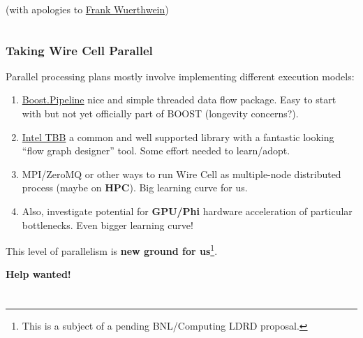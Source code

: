 \documentclass[xcolor=dvipsnames]{beamer}
\begin{document}
\begin{frame}
\begin{columns}
\begin{column}{0.30\textwidth}
\begin{center}
        \scriptsize (with apologies to \href{https://www.bnl.gov/events/details.php?q=11000}{Frank Wuerthwein})
      \end{center}
    \end{column}
  \end{columns}

\end{frame}

\begin{frame}
  \frametitle{Taking Wire Cell Parallel}

  Parallel processing plans mostly involve implementing different
  execution models:

  \begin{enumerate}\footnotesize
  \item \href{https://github.com/erenon/pipeline}{Boost.Pipeline} nice
    and simple threaded data flow package.  Easy to start with but not
    yet officially part of BOOST (longevity concerns?).
  \item \href{https://www.threadingbuildingblocks.org/}{Intel TBB} a
    common and well supported library with a fantastic looking ``flow
    graph designer'' tool.  Some effort needed to learn/adopt.
  \item MPI/ZeroMQ or other ways to run Wire Cell as multiple-node
    distributed process (maybe on \textbf{HPC}).  Big learning curve
    for us.
  \item Also, investigate potential for \textbf{GPU/Phi} hardware
    acceleration of particular bottlenecks. Even bigger learning curve!
  \end{enumerate}

  \vfill

  This level of parallelism is \textbf{new ground for us}\footnote{This is a subject of a pending BNL/Computing LDRD proposal.}.

  \vfill

  \textbf{Help wanted!}
\end{frame}


\section{}
\end{document}
